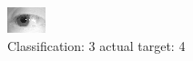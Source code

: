 \begin{figure}[h!]
\begin{center}
\includegraphics[width=0.60\columnwidth]{figures/ID1243_class_3_target_4.png}
\end{center}
\caption{ Classification: 3 actual target: 4}
\label{fig:ID1243_class_3_target_4}
\end{figure}
